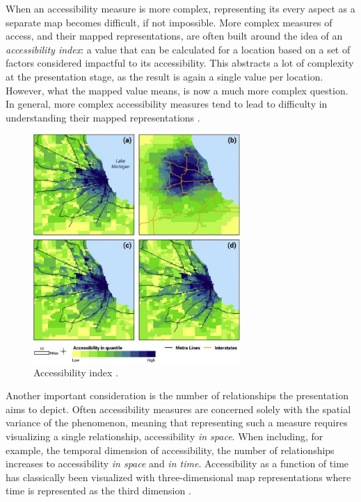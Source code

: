 When an accessibility measure is more complex,
representing its every aspect as a separate map becomes difficult,
if not impossible.
More complex measures of access, and their mapped representations,
are often built around the idea of
an \textit{accessibility index}:
a value that can be calculated for a location
based on a set of factors considered impactful to its accessibility.
This abstracts a lot of complexity at the presentation stage,
as the result is again a single value per location.  %
However, what the mapped value means, is now a much more complex question.
In general, more complex accessibility measures tend to lead to
difficulty in understanding their mapped representations \parencite{te2014}.

\begin{figure}[H]
	\centering
	\includegraphics[width=0.7\textwidth]{visual/figures/screenshots/accessibility_index_comparison}
	\caption{
		Accessibility index \parencite{kim2019}.
	}
	\label{fig:accessibility index}
\end{figure}


Another important consideration is
the number of relationships the presentation aims to depict.
Often accessibility measures are concerned solely with
the spatial variance of the phenomenon, meaning that
representing such a measure requires visualizing a single relationship,
accessibility \textit{in space}.
When including, for example, the temporal dimension of accessibility,
the number of relationships increases to
accessibility \textit{in space} and \textit{in time}.
Accessibility as a function of time
has classically been visualized with
three-dimensional map representations where
time is represented as the third dimension \parencite{hag1970, neu2011, kwa1998}.


